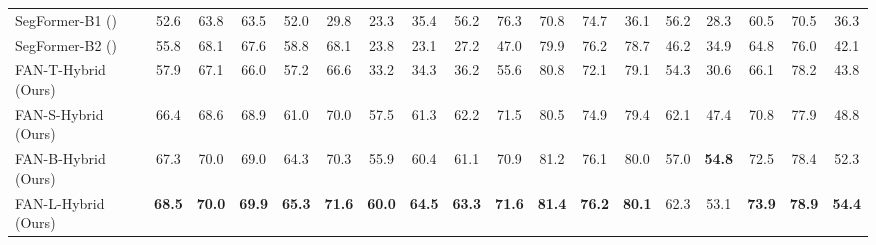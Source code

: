 \documentclass[nohyperref]{article}
\theoremstyle{plain}
\theoremstyle{definition}
\theoremstyle{remark}
\begin{document}
\begin{table*}[h!]
\begin{savenotes}
\begin{minipage*}{1.0\textwidth}
{\begin{tabular}{l|c|cccc|cccc|cccc|cccc}
\multicolumn{1}{l|}{SegFormer-B1 (\citeauthor{xie2021segformer})}& \multicolumn{1}{c|}{{52.6}} & {63.8}  & {63.5}  & {52.0}  & \multicolumn{1}{c|}{{29.8}} & {23.3}  & 35.4 & {56.2}  & {76.3}  & \multicolumn{1}{c}{{70.8}} & 74.7 & {36.1}  & {56.2}    & \multicolumn{1}{c}{{28.3}} & {60.5}  & {70.5}  & {36.3}  \\\multicolumn{1}{l|}{SegFormer-B2 (\citeauthor{xie2021segformer})}& \multicolumn{1}{c|}{{55.8}} & {68.1}  & {67.6}  & {58.8}  & \multicolumn{1}{c|}{{68.1}} & {23.8}  & 23.1 & {27.2}  & {47.0}  & \multicolumn{1}{c}{{79.9}} & 76.2 & {78.7}  & {46.2}    & \multicolumn{1}{c}{{34.9}} & {64.8}  & {76.0}  & {42.1}  \\
\midrule
\multicolumn{1}{l|}{FAN-T-Hybrid (Ours)}& \multicolumn{1}{c|}{ {57.9}} & {67.1}  & {66.0}  & {57.2}  & \multicolumn{1}{c|}{{66.6}} &  {33.2}  &  {34.3}  &  {36.2}  & \multicolumn{1}{c|}{ {55.6}} &  {80.8} & {72.1}  &  {79.1}  & {54.3}  & \multicolumn{1}{c}{{30.6}}   & {66.1}  &  {78.2}  & {43.8}  \\
\multicolumn{1}{l|}{FAN-S-Hybrid (Ours)}& \multicolumn{1}{c|}{ {66.4}} & {68.6}  & {68.9}  & {61.0}  & \multicolumn{1}{c|}{{70.0}} &  {57.5}  &  {61.3}  &  {62.2}  & \multicolumn{1}{c|}{ {71.5}} &  {80.5} & {74.9}  &  {79.4}  & {62.1}  & \multicolumn{1}{c}{{47.4}}   & {70.8}  &  {77.9}  & {48.8}  \\
\multicolumn{1}{l|}{FAN-B-Hybrid (Ours)}& \multicolumn{1}{c|}{ {67.3}} & {70.0}  & {69.0}  & {64.3}  & \multicolumn{1}{c|}{{70.3}} &  {55.9}  &  {60.4}  &  {61.1}  & \multicolumn{1}{c|}{ {70.9}} &  {81.2} & {76.1}  &  {80.0}  & {57.0}  & \multicolumn{1}{c}{\textbf{54.8}}   & {72.5}  &  {78.4}  & {52.3}  \\
\multicolumn{1}{l|}{FAN-L-Hybrid (Ours)}& \multicolumn{1}{c|}{\textbf{68.5}} & \textbf{70.0}  & \textbf{69.9}  & \textbf{65.3}  & \multicolumn{1}{c|}{\textbf{71.6}} & \textbf{60.0}  & \textbf{64.5}  & \textbf{63.3}  & \multicolumn{1}{c|}{\textbf{71.6}} & \textbf{81.4} & \textbf{76.2}  & \textbf{80.1}  & {62.3}  & \multicolumn{1}{c}{{53.1}}   & \textbf{73.9}  & \textbf{78.9}  & \textbf{54.4}  \\
\end{tabular}
}

\end{minipage*}
\end{savenotes}
\vspace{-2mm}
\end{table*}
\end{document}
